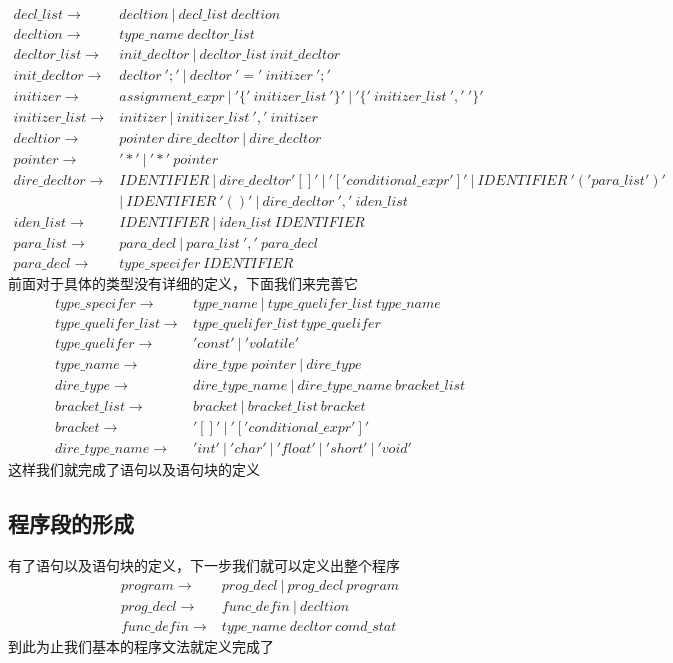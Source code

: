 \documentclass[UTF8]{ctexart}
\begin{document}
\begin{align*}
    decl\_list\to & decltion\ |\ decl\_list\ decltion\\
    decltion\to & type\_name\ decltor\_list\\
    decltor\_list\to & init\_decltor\ |\ decltor\_list\ init\_decltor\\
    init\_decltor\to & decltor\ ';'\ |\ decltor\ '='\ initizer\ ';'\\
    initizer\to & assignment\_expr\ |\ '\{'\ initizer\_list\ '\}'\ |\ '\{'\ initizer\_list\ ','\ '\}'\\
    initizer\_list\to & initizer\ |\ initizer\_list\ ','\ initizer\\
    decltior\to & pointer\ dire\_decltor\ |\ dire\_decltor\\
    pointer\to & '*'\ |\ '*'\ pointer\\
    dire\_decltor\to & IDENTIFIER\ |\ dire\_decltor'[]'\ |\ '['conditional\_expr']'\ |\ IDENTIFIER\ '('para\_list')'\\
    & |\ IDENTIFIER\ '()'\ |\ dire\_decltor\ ','\ iden\_list\\
    iden\_list\to & IDENTIFIER\ |\ iden\_list\ IDENTIFIER\\
    para\_list\to & para\_decl\ |\ para\_list\ ','\ para\_decl\\
    para\_decl\to & type\_specifer\ IDENTIFIER
\end{align*}
前面对于具体的类型没有详细的定义，下面我们来完善它
\begin{align*}
    type\_specifer\to & type\_name\ |\ type\_quelifer\_list\ type\_name\\
    type\_quelifer\_list\to & type\_quelifer\_list\ type\_quelifer\\
    type\_quelifer\to & 'const'\ |\ 'volatile'\\
    type\_name\to & dire\_type\ pointer\ |\ dire\_type\\
    dire\_type\to & dire\_type\_name\ |\ dire\_type\_name\ bracket\_list\\
    bracket\_list\to & bracket\ |\ bracket\_list\ bracket\\
    bracket\to & '[]'\ |\ '['conditional\_expr']'\\
    dire\_type\_name\to & 'int'\ |\ 'char'\ |\ 'float'\ |\ 'short'\ |\ 'void'
\end{align*}
这样我们就完成了语句以及语句块的定义
\subsection{程序段的形成}
有了语句以及语句块的定义，下一步我们就可以定义出整个程序
\begin{align*}
    program\to & prog\_decl\ |\ prog\_decl\ program\\
    prog\_decl\to & func\_defin\ |\ decltion\\
    func\_defin\to & type\_name\ decltor\ comd\_stat
\end{align*}
到此为止我们基本的程序文法就定义完成了
\end{document}
